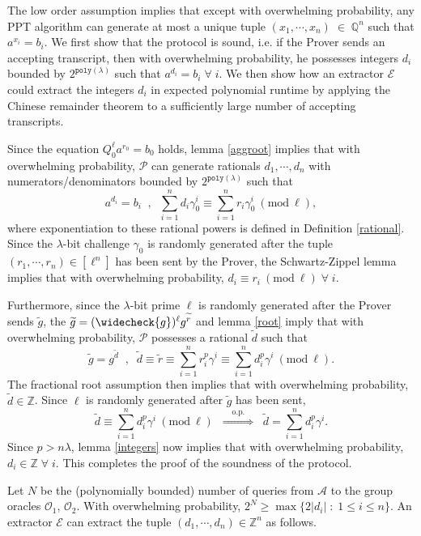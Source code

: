 \documentclass[11pt, lettersize, notitlepage, leqno, footskip=0.6cm]{article}
\newcommand{\bz}{\mathbb Z}
\newcommand{\bq}{\mathbb Q}
\newcommand{\slim}{\sum\limits}
\newcommand{\ttt}{\texttt}
\newcommand{\impop}{\overset{\;\;\;\;\mr{o.p.}\;\;\;\;}{\Longrightarrow}}
\newcommand{\wti}{\widetilde}
\newcommand{\mc}{\mathcal}
\newcommand{\mr}{\mathrm}
\newcommand{\lam}{\lambda}
\newcommand{\weck}{\widecheck}
\newcommand{\mP}{\mc{P}}
\newcommand{\A}{\mc{A}}
\newcommand{\vs}{\vspace{-0.15cm}}
\newcommand{\op}{overwhelming probability}
\newcommand{\Mod}[1]{\ (\mathrm{mod}\ #1)}
\newcommand{\E}{\mc{E}}
\numberwithin{equation}{section}
\begin{document}
\begin{prf} The low order assumption implies that except with \op, any PPT algorithm can generate at most a unique tuple $(x_1,\cdots,x_n)\;\in\;\bq^n$ such that $a^{x_i} = b_i$. We first show that the protocol is sound, i.e. if the Prover sends an accepting transcript, then with \op, he possesses integers $d_i$ bounded by $2^{\ttt{poly}(\lam)}$ such that $a^{d_i} = b_i\;\forall\;i$.
We then show how an extractor $\E$ could extract the integers $d_i$ in expected polynomial runtime by applying the Chinese remainder theorem to a sufficiently large number of accepting transcripts. 

Since the equation $Q_0^{\ell}a^{r_0} = b_0$ holds, lemma \ref{aggroot} implies that with \op, 
$\mP$ can generate rationals $d_1,\cdots,d_n$ with numerators/denominators bounded by $2^{\ttt{poly}(\lam)}$ such that \vs $$a^{d_i} = b_i \;\;,\;\;\slim_{i=1}^{n} d_i\gamma_{0}^i \equiv \slim_{i=1}^{n} r_i\gamma_{0}^i\Mod{\ell},$$ where exponentiation to these rational powers is defined in Definition \ref{rational}. Since the $\lam$-bit challenge $\gamma_{0}$ is randomly generated after the tuple $(r_1,\cdots,r_n)\in[\ell^n]$ has been sent by the Prover, the Schwartz-Zippel lemma implies that with \op, $d_i\equiv r_i\Mod{\ell}\;\forall\;i$. 

Furthermore, since the $\lam$-bit prime $\ell$ is randomly generated after the Prover sends $\wti{g}$, the $\wti{g} = (\weck{g})^{\ell}g^{\wti{r}}$ and lemma \ref{root} imply that with \op, $\mP$ possesses a rational $\wti{d}$ such that \vs $$\wti{g} = g^{\wti{d}}\;\;,\;\;\wti{d}\equiv\wti{r}\equiv \slim_{i=1}^n r_i^p\gamma^i\equiv \slim_{i=1}^n d_i^p\gamma^i\Mod{\ell} .$$ The fractional root assumption then implies that with \op, $\wti{d}\in \bz$. Since $\ell$ is randomly generated after $\wti{g}$ has been sent, \vs $$\wti{d}\equiv \slim_{i=1}^n d_i^p\gamma^i\Mod{\ell}\;\;\impop\;\;\wti{d} = \slim_{i=1}^n d_i^p\gamma^i.$$ Since $p> n\lam$, lemma \ref{integers} now implies that with \op, $d_i\in\bz\;\forall\;i$. This completes the proof of the soundness of the protocol.

Let $N$ be the (polynomially bounded) number of queries from $\A$ to the group oracles $\mc{O}_1$, $\mc{O}_2$. With \op, $2^{N} \geq \max\{2|d_i|\;:\;1\leq i\leq n \}$. An extractor $\E$ can extract the tuple $(d_1,\cdots,d_n)\in\bz^n$ as follows. 


\end{prf}
\end{document}
